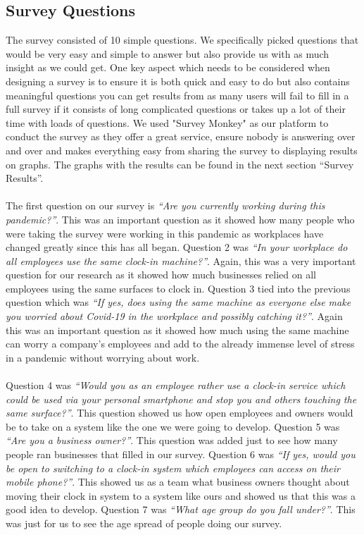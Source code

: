\subsection{Survey Questions}
The survey consisted of 10 simple questions. We specifically picked questions that would be very easy and simple to answer but also provide us with as much insight as we could get. One key aspect which needs to be considered when designing a survey is to ensure it is both quick and easy to do but also contains meaningful questions you can get results from as many users will fail to fill in a full survey if it consists of long complicated questions or takes up a lot of their time with loads of questions. We used "Survey Monkey" as our platform to conduct the survey as they offer a great service, ensure nobody is answering over and over and makes everything easy from sharing the survey to displaying results on graphs. The graphs with the results can be found in the next section “Survey Results”.
\\
\\
The first question on our survey is \textit{“Are you currently working during this pandemic?”}. This was an important question as it showed how many people who were taking the survey were working in this pandemic as workplaces have changed greatly since this has all began. Question 2 was \textit{“In your workplace do all employees use the same clock-in machine?”}. Again, this was a very important question for our research as it showed how much businesses relied on all employees using the same surfaces to clock in. Question 3 tied into the previous question which was \textit{“If yes, does using the same machine as everyone else make you worried about Covid-19 in the workplace and possibly catching it?”}. Again this was an important question as it showed how much using the same machine can worry a company’s employees and add to the already immense level of stress in a pandemic without worrying about work.
\\
\\
Question 4 was \textit{“Would you as an employee rather use a clock-in service which could be used via your personal smartphone and stop you and others touching the same surface?”}. This question showed us how open employees and owners would be to take on a system like the one we were going to develop. Question 5 was \textit{“Are you a business owner?”}. This question was added just to see how many people ran businesses that filled in our survey. Question 6 was \textit{“If yes, would you be open to switching to a clock-in system which employees can access on their mobile phone?”}. This showed us as a team what business owners thought about moving their clock in system to a system like ours and showed us that this was a good idea to develop. Question 7 was \textit{“What age group do you fall under?”}. This was just for us to see the age spread of people doing our survey.
